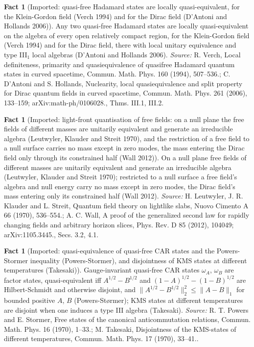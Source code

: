 \documentclass[11pt]{article}
\theoremstyle{definition}
\newtheorem{fact}[theorem]{Fact}
\theoremstyle{plain}
\begin{document}
\begin{fact}[Imported: quasi-free Hadamard states are locally quasi-equivalent, for the Klein-Gordon field (Verch 1994) and for the Dirac field (D'Antoni and Hollands 2006)]\label{c:synthesis.imported-local-quasi-equivalence-of-hadamard-states}
Any two quasi-free Hadamard states are locally quasi-equivalent on the algebra of every open relatively compact region, for the Klein-Gordon field (Verch 1994) and for the Dirac field, there with local unitary equivalence and type III$_{1}$ local algebras (D'Antoni and Hollands 2006).
\emph{Source:} R. Verch, Local definiteness, primarity and quasiequivalence of quasifree Hadamard quantum states in curved spacetime, Commun. Math. Phys. 160 (1994), 507--536.; C. D'Antoni and S. Hollands, Nuclearity, local quasiequivalence and split property for Dirac quantum fields in curved spacetime, Commun. Math. Phys. 261 (2006), 133--159; arXiv:math-ph/0106028., Thms. III.1, III.2.
\end{fact}

\begin{fact}[Imported: light-front quantisation of free fields: on a null plane the free fields of different masses are unitarily equivalent and generate an irreducible algebra (Leutwyler, Klauder and Streit 1970), and the restriction of a free field to a null surface carries no mass except in zero modes, the mass entering the Dirac field only through its constrained half (Wall 2012)]\label{c:synthesis.imported-null-plane-restriction-of-free-fields-is-mass-independent}
On a null plane free fields of different masses are unitarily equivalent and generate an irreducible algebra (Leutwyler, Klauder and Streit 1970); restricted to a null surface a free field's algebra and null energy carry no mass except in zero modes, the Dirac field's mass entering only its constrained half (Wall 2012).
\emph{Source:} H. Leutwyler, J. R. Klauder and L. Streit, Quantum field theory on lightlike slabs, Nuovo Cimento A 66 (1970), 536--554.; A. C. Wall, A proof of the generalized second law for rapidly changing fields and arbitrary horizon slices, Phys. Rev. D 85 (2012), 104049; arXiv:1105.3445., Secs. 3.2, 4.1.
\end{fact}

\begin{fact}[Imported: quasi-equivalence of quasi-free CAR states and the Powers-Stormer inequality (Powers-Stormer), and disjointness of KMS states at different temperatures (Takesaki)]\label{c:synthesis.imported-powers-stormer-takesaki-disjointness}
Gauge-invariant quasi-free CAR states $\omega_{A}$, $\omega_{B}$ are factor states, quasi-equivalent iff $A^{1/2} - B^{1/2}$ and $(1 - A)^{1/2} - (1 - B)^{1/2}$ are Hilbert-Schmidt and otherwise disjoint, and $\|A^{1/2} - B^{1/2}\|_{2}^{2} \le \|A - B\|_{1}$ for bounded positive $A$, $B$ (Powers-Størmer); KMS states at different temperatures are disjoint when one induces a type III algebra (Takesaki).
\emph{Source:} R. T. Powers and E. Stormer, Free states of the canonical anticommutation relations, Commun. Math. Phys. 16 (1970), 1--33.; M. Takesaki, Disjointness of the KMS-states of different temperatures, Commun. Math. Phys. 17 (1970), 33--41..
\end{fact}
\end{document}
